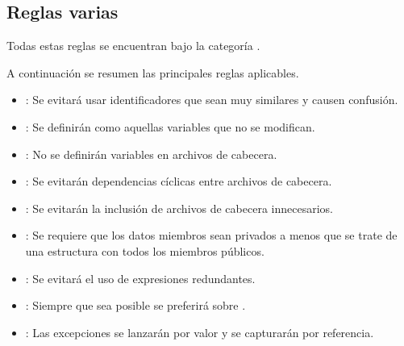 \subsection{Reglas varias}

Todas estas reglas se encuentran bajo la categoría .

A continuación se resumen las principales reglas aplicables.

\begin{itemize}

\item {}:
Se evitará usar identificadores que sean muy similares y causen confusión.

\item {}:
Se definirán como  aquellas variables que no se modifican.

\item {}:
No se definirán variables en archivos de cabecera.

\item {}:
Se evitarán dependencias cíclicas entre archivos de cabecera.

\item {}:
Se evitarán la inclusión de archivos de cabecera innecesarios.

\item {}:
Se requiere que los datos miembros sean privados a menos que se trate de
una estructura con todos los miembros públicos.

\item {}:
Se evitará el uso de expresiones redundantes.

\item {}:
Siempre que sea posible se preferirá  sobre .

\item {}:
Las excepciones se lanzarán por valor y se capturarán por referencia.

\end{itemize}

